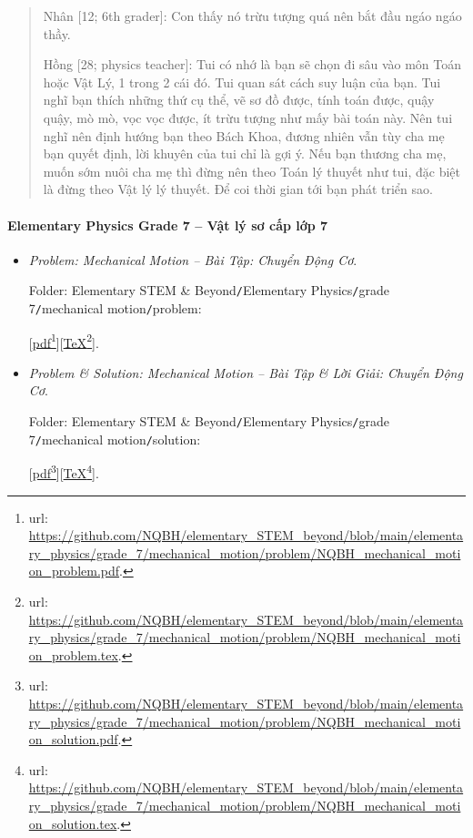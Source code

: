 \documentclass[12pt]{article}
\begin{document}
\begin{quotation}
	{\sf Nhân [12; 6th grader]}: Con thấy nó trừu tượng quá nên bắt đầu ngáo ngáo thầy.
	\vspace{2mm}
	
	{\sf Hồng [28; physics teacher]}: Tui có nhớ là bạn sẽ chọn đi sâu vào môn Toán hoặc Vật Lý, 1 trong 2 cái đó. Tui quan sát cách suy luận của bạn. Tui nghĩ bạn thích những thứ cụ thể, vẽ sơ đồ được, tính toán được, quậy quậy, mò mò, vọc vọc được, ít trừu tượng như mấy bài toán này. Nên tui nghĩ nên định hướng bạn theo Bách Khoa, đương nhiên vẫn tùy cha mẹ bạn quyết định, lời khuyên của tui chỉ là gợi ý. Nếu bạn thương cha mẹ, muốn sớm nuôi cha mẹ thì đừng nên theo Toán lý thuyết như tui, đặc biệt là đừng theo Vật lý lý thuyết. Để coi thời gian tới bạn phát triển sao.
\end{quotation}

\paragraph{Elementary Physics Grade 7 -- Vật lý sơ cấp lớp 7}

\begin{itemize}
	\item {\it Problem: Mechanical Motion -- Bài Tập: Chuyển Động Cơ}.
	
	Folder: {\sf Elementary STEM \& Beyond{\tt/}Elementary Physics{\tt/}grade 7{\tt/}mechanical motion{\tt/}problem}:
	
	[\href{https://github.com/NQBH/elementary_STEM_beyond/blob/main/elementary_physics/grade_7/mechanical_motion/problem/NQBH_mechanical_motion_problem.pdf}{pdf}\footnote{{\sc url}: \url{https://github.com/NQBH/elementary_STEM_beyond/blob/main/elementary_physics/grade_7/mechanical_motion/problem/NQBH_mechanical_motion_problem.pdf}.}][\href{https://github.com/NQBH/elementary_STEM_beyond/blob/main/elementary_physics/grade_7/mechanical_motion/problem/NQBH_mechanical_motion_problem.tex}{\TeX}\footnote{{\sc url}: \url{https://github.com/NQBH/elementary_STEM_beyond/blob/main/elementary_physics/grade_7/mechanical_motion/problem/NQBH_mechanical_motion_problem.tex}.}].
	\item {\it Problem \& Solution: Mechanical Motion -- Bài Tập \& Lời Giải: Chuyển Động Cơ}.
	
	Folder: {\sf Elementary STEM \& Beyond{\tt/}Elementary Physics{\tt/}grade 7{\tt/}mechanical motion{\tt/}solution}:
	
	[\href{https://github.com/NQBH/elementary_STEM_beyond/blob/main/elementary_physics/grade_7/mechanical_motion/problem/NQBH_mechanical_motion_solution.pdf}{pdf}\footnote{{\sc url}: \url{https://github.com/NQBH/elementary_STEM_beyond/blob/main/elementary_physics/grade_7/mechanical_motion/problem/NQBH_mechanical_motion_solution.pdf}.}][\href{https://github.com/NQBH/elementary_STEM_beyond/blob/main/elementary_physics/grade_7/mechanical_motion/problem/NQBH_mechanical_motion_solution.tex}{\TeX}\footnote{{\sc url}: \url{https://github.com/NQBH/elementary_STEM_beyond/blob/main/elementary_physics/grade_7/mechanical_motion/problem/NQBH_mechanical_motion_solution.tex}.}].
\end{itemize}
\end{document}
